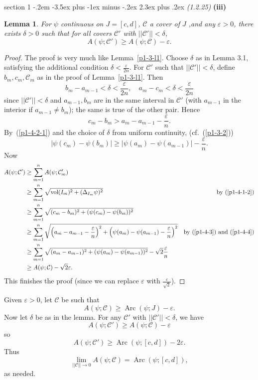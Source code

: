 \documentclass[12pt]{article}
\makeatletter
\theoremstyle{norm}
\newtheorem{lem}[thm]{Lemma}
\providecommand{\cal}[1]{\mathcal{#1}}
\renewcommand{\cal}[1]{\mathcal{#1}}
\newcommand{\nin}[0]{\not\in}
\newcommand{\de}[0]{\delta}
\newcommand{\De}[0]{\Delta}
\newcommand{\ep}[0]{\varepsilon}
\newcommand{\pa}[1]{\left( {#1} \right)}
\newcommand{\subprob}[1]{\noindent\textbf{#1}\\}
\newcommand{\Arc}{\operatorname{Arc}}
\newcommand{\Var}{\operatorname{Var}}
\newcommand{\vol}[0]{\operatorname{vol}}
\newenvironment{problem}{\@startsection
       {section}
       {1}
       {-.2em}
       {-3.5ex plus -1ex minus -.2ex}
       {2.3ex plus .2ex}
       {\pagebreak[3]%
       \large\bf\noindent{Problem }
       }
       }
       {%
       }
\makeatother
\begin{document}
\begin{problem} {\it (1.2.25)}
\subprob{(iii)}
\begin{lem}\label{p1-4-l2}
For $\psi$ continuous on $J=[c,d]$, $\cal C$ a cover of $J$ ,and any $\ep>0$, there exists $\de>0$ such that for all covers $\cal C'$ with $||\cal C'||<\de$, 
\[
A(\psi;\cal C')\geq A(\psi;\cal C)-\ep.
\]
\end{lem}
\begin{proof}
The proof is very much like Lemma~\ref{p1-3-l1}. 
Choose $\de$ as in Lemma 3.1, satisfying the additional condition $\de<\frac{\ep}{2n}$. For $\cal C'$ such that $||\cal C'||<\de$, define $b_m,c_m,\cal C_m$ as in the proof of Lemma~\ref{p1-3-l1}.
Then
\begin{equation}\label{p1-4-2-1}
b_m-a_{m-1}< \de<\frac{\ep}{2n}, \quad a_m-c_m< \de<\frac{\ep}{2n}
\end{equation}
since $||\cal C'||<\de$ and $a_{m-1},b_m$ are in the same interval in $\cal C'$ (with $a_{m-1}$ in the interior if $a_{m-1}\neq b_m$); the same is true of the other pair. Hence
\begin{equation}\label{p1-4-3}
c_m-b_m> a_m-a_{m-1}-\frac{\ep}{n}.
\end{equation}
 By~(\ref{p1-4-2-1}) and the choice of $\de$ from uniform continuity, (cf.~(\ref{p1-3-2}))
\begin{equation}\label{p1-4-4}
|\psi(c_m)-\psi(b_m)|\geq |\psi(a_m)-\psi( a_{m-1})|-\frac{\ep}{n}.
\end{equation}
Now
\begin{align*}
A(\psi;\cal C')
&\geq \sum_{m=1}^nA(\psi;\cal C'_m)\\
&\geq \sum_{m=1}^n
\sqrt{\vol(I_m)^2+(\De_{I_m}\psi)^2}
&\text{by~(\ref{p1-4-1-2})}\\
&\geq \sum_{m=1}^n
\sqrt{(c_m-b_m)^2+(\psi(c_m)-\psi(b_m))^2}\\
&\geq \sum_{m=1}^n
\sqrt{\pa{a_m-a_{m-1}-\frac{\ep}n}^2+\pa{\psi(a_m)-\psi(a_{m-1})-\frac{\ep}n}^2}
&\text{by~(\ref{p1-4-3}) and~(\ref{p1-4-4})}\\
&\geq \sum_{m=1}^n
\sqrt{(a_m-a_{m-1})^2+(\psi(a_m)-\psi(a_{m-1}))^2}-\sqrt2 \frac{\ep}{n}\\
&
\geq A(\psi;\cal C)-\sqrt 2\ep.
\end{align*}
This finishes the proof (since we can replace $\ep$ with $\frac{\ep}{\sqrt 2}$).\end{proof}
Given $\ep>0$, let $\cal C$ be such that
\[
A(\psi;\cal C)\geq \Arc(\psi;J)-\ep.
\]
Now let $\de$ be as in the lemma. For any $\cal C'$ with $||\cal C'||<\de$, we have
\[
A(\psi;\cal C')\geq A(\psi;\cal C)-\ep
\]
so
\[
A(\psi;\cal C')\geq \Arc(\psi;[c,d])-2\ep.
\]
Thus 
\[\lim_{||\cal C||\to 0}A(\psi;\cal C)= \Arc(\psi;[c,d]),\]
as needed.
\end{problem}
\end{document}
